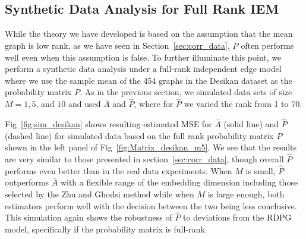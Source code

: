 \documentclass[10pt,letterpaper]{article}
\begin{document}
%
%


\subsection{Synthetic Data Analysis for Full Rank IEM}\label{sec:sim_iem}

While the theory we have developed is based on the assumption that the mean graph is low rank, as we have seen in Section~\ref{sec:corr_data}, $\hat{P}$ often performs well even when this assumption is false. 
To further illuminate this point, we perform a synthetic data analysis under a full-rank independent edge model where we use the sample mean of the 454 graphs in the Desikan dataset as the probability matrix $P$.
As in the previous section, we simulated data sets of size $M=1,5$, and $10$ and used $\bar{A}$ and $\hat{P}$, where for $\hat{P}$ we varied the rank from 1 to 70.

Fig~\ref{fig:sim_desikan} shows resulting estimated MSE for $\bar{A}$ (solid line) and $\hat{P}$ (dashed line) for simulated data based on the full rank probability matrix $P$ shown in the left panel of Fig~\ref{fig:Matrix_desikan_m5}.
We see that the results are very similar to those presented in section~\ref{sec:corr_data}, though overall $\hat{P}$ performs even better than in the real data experiments. 
When $M$ is small, $\hat{P}$ outperforms $\bar{A}$ with a flexible range of the embedding dimension including those selected by the Zhu and Ghodsi method while when $M$ is large enough, both estimators perform well with the decision between the two being less conclusive.
This simulation again shows the robustness of $\hat{P}$ to deviations from the RDPG model, specifically if the probability matrix is full-rank.
\end{document}
